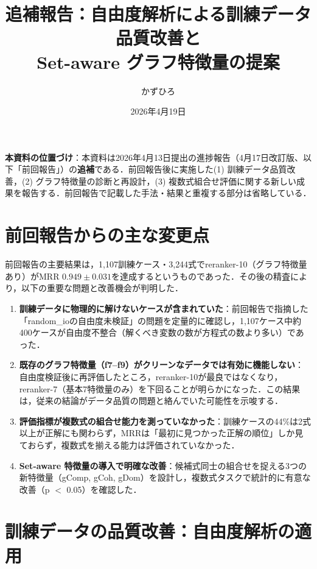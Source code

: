 \documentclass[11pt,a4paper]{ltjsarticle}
\title{{\sffamily 追補報告：自由度解析による訓練データ品質改善と\\Set-aware グラフ特徴量の提案}}
\author{かずひろ}
\date{2026年4月19日}
\begin{document}
\maketitle

\noindent\textbf{本資料の位置づけ}：本資料は2026年4月13日提出の進捗報告（4月17日改訂版、以下「前回報告」）の\textbf{追補}である．前回報告後に実施した(1) 訓練データ品質改善，(2) グラフ特徴量の診断と再設計，(3) 複数式組合せ評価に関する新しい成果を報告する．前回報告で記載した手法・結果と重複する部分は省略している．

\section{前回報告からの主な変更点}

前回報告の主要結果は，1{,}107訓練ケース・3{,}244式でreranker-10（グラフ特徴量あり）がMRR $\mathbf{0.949 \pm 0.031}$を達成するというものであった．その後の精査により，以下の重要な問題と改善機会が判明した．

\begin{enumerate}[leftmargin=2em, nosep]
  \item \textbf{訓練データに物理的に解けないケースが含まれていた}：前回報告で指摘した「random\_ioの自由度未検証」の問題を定量的に確認し，1{,}107ケース中約400ケースが自由度不整合（解くべき変数の数が方程式の数より多い）であった．
  \item \textbf{既存のグラフ特徴量（f7--f9）がクリーンなデータでは有効に機能しない}：自由度検証後に再評価したところ，reranker-10が最良ではなくなり，reranker-7（基本7特徴量のみ）を下回ることが明らかになった．この結果は，従来の結論がデータ品質の問題と絡んでいた可能性を示唆する．
  \item \textbf{評価指標が複数式の組合せ能力を測っていなかった}：訓練ケースの44\%は2式以上が正解にも関わらず，MRRは「最初に見つかった正解の順位」しか見ておらず，複数式を揃える能力は評価されていなかった．
  \item \textbf{Set-aware 特徴量の導入で明確な改善}：候補式同士の組合せを捉える3つの新特徴量（gComp, gCoh, gDom）を設計し，複数式タスクで統計的に有意な改善（p $<$ 0.05）を確認した．
\end{enumerate}

\section{訓練データの品質改善：自由度解析の適用}
\end{document}
